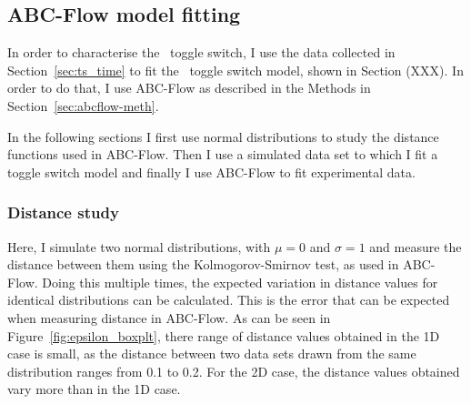 
\subsection{ABC-Flow model fitting }

In order to characterise the~\textcite{Litcofsky:2012gr} toggle switch, I use the data collected in Section~\ref{sec:ts_time} to fit the~\textcite{Gardner:2000vha} toggle switch model, shown in Section (XXX). In order to do that, I use ABC-Flow as described in the Methods in Section~\ref{sec:abcflow-meth}.


In the following sections I first use normal distributions to study the distance functions used in ABC-Flow. Then I use a simulated data set to which I fit a toggle switch model and finally I use ABC-Flow to fit experimental data.  

\subsubsection{Distance study}

Here, I simulate two normal distributions, with $\mu=0$ and $\sigma=1$ and measure the distance between them using the Kolmogorov-Smirnov test, as used in ABC-Flow. Doing this multiple times, the expected variation in distance values for identical distributions can be calculated. This is the error that can be expected when measuring distance in ABC-Flow. As can be seen in Figure~\ref{fig:epsilon_boxplt}, there range of distance values obtained in the 1D case is small, as the distance between two data sets drawn from the same distribution ranges from 0.1 to 0.2. For the 2D case, the distance values obtained vary more than in the 1D case. 


